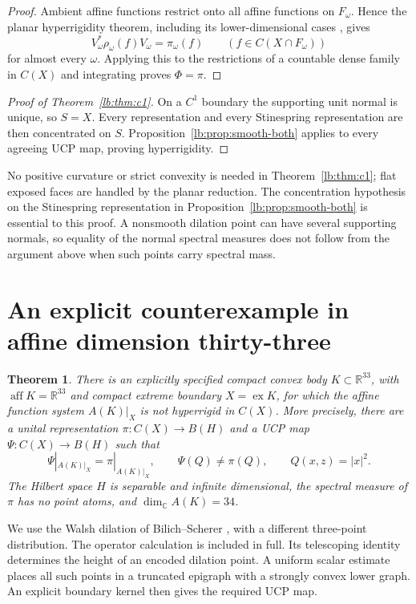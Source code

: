 \documentclass[11pt,letterpaper]{amsart}
\newtheorem{theorem}{Theorem}[section]
\theoremstyle{definition}
\theoremstyle{remark}
\numberwithin{equation}{section}
\DeclareMathOperator{\ex}{ex}
\DeclareMathOperator{\aff}{aff}
\begin{document}
\begin{proof}
Ambient affine functions restrict onto all affine
functions on $F_\omega$. Hence the planar hyperrigidity
theorem, including its lower-dimensional cases
\cite[Theorem~3.8]{planar}, gives
\[
             V_\omega^*\rho_\omega(f)V_\omega
                  =\pi_\omega(f)
             \qquad(f\in C(X\cap F_\omega))
\]
for almost every $\omega$. Applying this to the
restrictions of a countable dense family in $C(X)$ and
integrating proves $\Phi=\pi$.
\end{proof}

\begin{proof}[Proof of Theorem~\ref{lb:thm:c1}]
On a $C^1$ boundary the supporting unit normal is unique,
so $S=X$. Every representation and every Stinespring
representation are then concentrated on $S$.
Proposition~\ref{lb:prop:smooth-both} applies to every
agreeing UCP map, proving hyperrigidity.
\end{proof}

No positive curvature or strict convexity is needed in
Theorem~\ref{lb:thm:c1}; flat exposed faces are handled by
the planar reduction. The concentration hypothesis on the
Stinespring representation in
Proposition~\ref{lb:prop:smooth-both} is essential to this
proof. A nonsmooth dilation point can have several supporting
normals, so equality of the normal spectral measures does
not follow from the argument above when such points carry
spectral mass.

\section{An explicit counterexample in affine dimension thirty-three}
\label{sec:construction}

\begin{theorem}\label{thm:main}
There is an explicitly specified compact convex body
\(K\subset\mathbb R^{33}\), with \(\aff K=\mathbb R^{33}\) and
compact extreme boundary \(X=\ex K\), for which the affine function
system \(A(K)|_X\) is not hyperrigid in \(C(X)\).
More precisely, there are a unital representation
\(\pi:C(X)\to B(H)\) and a UCP map \(\Psi:C(X)\to B(H)\) such that
\[
 \Psi|_{A(K)|_X}=\pi|_{A(K)|_X},\qquad \Psi(Q)\ne\pi(Q),
 \qquad Q(x,z)=|x|^2.
\]
The Hilbert space \(H\) is separable and infinite dimensional,
the spectral measure of \(\pi\) has no point atoms, and
\(\dim_{\mathbb C}A(K)=34\).
\end{theorem}

We use the Walsh dilation of Bilich--Scherer \cite[Section 3]{BS},
with a different three-point distribution. The operator calculation
is included in full. Its telescoping identity determines the height
of an encoded dilation point. A uniform scalar estimate places all
such points in a truncated epigraph with a strongly convex lower graph. An explicit
boundary kernel then gives the required UCP map.
\end{document}
